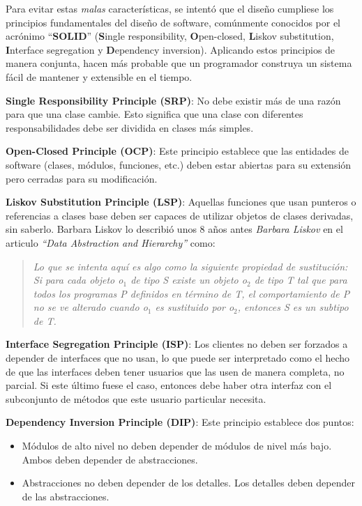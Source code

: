 Para evitar estas \textit{malas} características, se intentó que el diseño cumpliese los principios fundamentales del diseño de software,
comúnmente conocidos por el acrónimo ``\textbf{SOLID}''\cite{objmentor} (\textbf{S}ingle responsibility, \textbf{O}pen-closed,
\textbf{L}iskov substitution, \textbf{I}nterface segregation y \textbf{D}ependency inversion). Aplicando estos principios de manera
conjunta, hacen más probable que un programador construya un sistema fácil de mantener y extensible en el tiempo.
\begin{description}
    \item   \textbf{Single Responsibility Principle (SRP)}: No debe existir más de una razón para que una clase cambie. Esto significa
            que una clase con diferentes responsabilidades debe ser dividida en clases más simples.
    \item   \textbf{Open-Closed Principle (OCP)}: Este principio establece que las entidades de software (clases, módulos, funciones,
            etc.) deben estar abiertas para su extensión pero cerradas para su modificación\cite{oosc}.
    \item   \textbf{Liskov Substitution Principle (LSP)}: Aquellas funciones que usan punteros o referencias a clases base deben ser capaces
            de utilizar objetos de clases derivadas, sin saberlo. Barbara Liskov lo describió unos 8 años antes \textit{Barbara Liskov} en
            el articulo \textit{``Data Abstraction and Hierarchy''} \cite{Liskov:1987:KAD:62139.62141} como:
            \begin{quote}
                \textit{Lo que se intenta aquí es algo como la siguiente propiedad de sustitución: Si para cada objeto o$_1$ de tipo S
                existe un objeto o$_2$ de tipo T tal que para todos los programas P definidos en t\'ermino de T, el comportamiento de P no
                se ve alterado cuando o$_1$ es sustituido por o$_2$, entonces S es un subtipo de T.}
            \end{quote}
    \item   \textbf{Interface Segregation Principle (ISP)}: Los clientes no deben ser forzados a depender de interfaces que no usan, lo que
            puede ser interpretado como el hecho de que las interfaces deben tener usuarios que las usen de manera completa, no parcial. Si
            este último fuese el caso, entonces debe haber otra interfaz con el subconjunto de métodos que este usuario particular
            necesita.
    \item   \textbf{Dependency Inversion Principle (DIP)}: Este principio establece dos puntos:
            \begin{itemize}
                \item   Módulos de alto nivel no deben depender de módulos de nivel más bajo. Ambos deben depender de abstracciones.
                \item   Abstracciones no deben depender de los detalles. Los detalles deben depender de las abstracciones.
            \end{itemize}   
\end{description}

